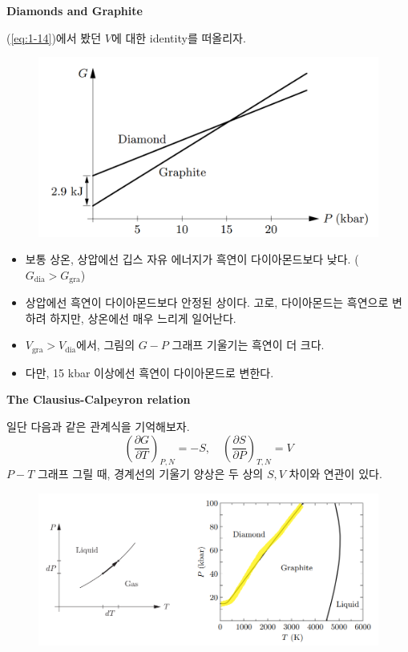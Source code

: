 \documentclass{article}
\begin{document}
\noindent
\textbf{Diamonds and Graphite}

(\ref{eq:1-14})에서 봤던 $V$에 대한 identity를 떠올리자.

\begin{figure}[h]
    \centering
    \includegraphics[width=0.6\linewidth]{images/fig3_4.png}
\end{figure}

\begin{itemize}
    \item 보통 상온, 상압에선 깁스 자유 에너지가 흑연이 다이아몬드보다 낮다. ($G_{\text{dia}} > G_{\text{gra}}$)
    \item 상압에선 흑연이 다이아몬드보다 안정된 상이다. 고로, 다이아몬드는 흑연으로 변하려 하지만, 상온에선 매우 느리게 일어난다.
    \item $V_{\text{gra}} > V_\text{dia}$에서, 그림의 $G-P$ 그래프 기울기는 흑연이 더 크다.
    \item 다만, 15 kbar 이상에선 흑연이 다이아몬드로 변한다.
\end{itemize}

\newpage

\noindent
\textbf{The Clausius-Calpeyron relation}

일단 다음과 같은 관계식을 기억해보자.
\begin{equation}
    \left( \frac{\partial G}{\partial T} \right)_{P,N} = -S, \quad \left( \frac{\partial S}{\partial P} \right)_{T,N} = V
\end{equation}
$P-T$ 그래프 그릴 때, 경계선의 기울기 양상은 두 상의 $S,V$ 차이와 연관이 있다. 

\begin{figure}[h]
    \centering
    \includegraphics[width=0.8\linewidth]{images/fig3_5.png}
\end{figure}
\end{document}

